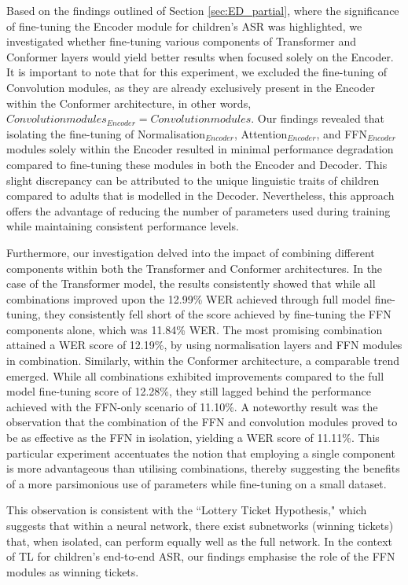 Based on the findings outlined of Section \ref{sec:ED_partial}, where the significance of fine-tuning the Encoder module for children's \ac{ASR} was highlighted, we investigated whether fine-tuning various components of Transformer and Conformer layers would yield better results when focused solely on the Encoder. It is important to note that for this experiment, we excluded the fine-tuning of Convolution modules, as they are already exclusively present in the Encoder within the Conformer architecture, in other words, $Convolution modules_{Encoder} = Convolution modules$. Our findings revealed that isolating the fine-tuning of Normalisation$_{Encoder}$, Attention$_{Encoder}$, and FFN$_{Encoder}$ modules solely within the Encoder resulted in minimal performance degradation compared to fine-tuning these modules in both the Encoder and Decoder. This slight discrepancy can be attributed to the unique linguistic traits of children compared to adults that is modelled in the Decoder. Nevertheless, this approach offers the advantage of reducing the number of parameters used during training while maintaining consistent performance levels.

Furthermore, our investigation delved into the impact of combining different components within both the Transformer and Conformer architectures. In the case of the Transformer model, the results consistently showed that while all combinations improved upon the 12.99\% \ac{WER} achieved through full model fine-tuning, they consistently fell short of the score achieved by fine-tuning the \ac{FFN} components alone, which was 11.84\% \ac{WER}. The most promising combination attained a \ac{WER} score of 12.19\%, by using normalisation layers and \ac{FFN} modules in combination.
Similarly, within the Conformer architecture, a comparable trend emerged. While all combinations exhibited improvements compared to the full model fine-tuning score of 12.28\%, they still lagged behind the performance achieved with the \ac{FFN}-only scenario of 11.10\%. A noteworthy result was the observation that the combination of the \ac{FFN} and convolution modules proved to be as effective as the \ac{FFN} in isolation, yielding a \ac{WER} score of 11.11\%. This particular experiment accentuates the notion that employing a single component is more advantageous than utilising combinations, thereby suggesting the benefits of a more parsimonious use of parameters while fine-tuning on a small dataset.

This observation is consistent with the ``Lottery Ticket Hypothesis," which suggests that within a neural network, there exist subnetworks (winning tickets) that, when isolated, can perform equally well as the full network. In the context of \ac{TL} for children's end-to-end \ac{ASR}, our findings emphasise the role of the \ac{FFN} modules as winning tickets.

